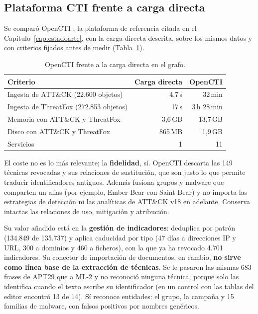 \subsection{Plataforma CTI frente a carga directa}

Se comparó OpenCTI \cite{opencti}, la plataforma de referencia citada en el
Capítulo~\ref{cap:estadoarte}, con la carga directa descrita, sobre los mismos datos y con
criterios fijados antes de medir (Tabla~\ref{tab:opencti}).

\begin{table}[H]
\centering
\begin{tabular}{|l|r|r|}
\hline
\textbf{Criterio} & \textbf{Carga directa} & \textbf{OpenCTI} \\
\hline
Ingesta de ATT\&CK (22.600 objetos) & 4,7\,s & 32\,min \\
Ingesta de ThreatFox (272.853 objetos) & 17\,s & 3\,h 28\,min \\
Memoria con ATT\&CK y ThreatFox & 3,6\,GB & 13,7\,GB \\
Disco con ATT\&CK y ThreatFox & 865\,MB & 1,9\,GB \\
Servicios & 1 & 11 \\
\hline
\end{tabular}
\caption{OpenCTI frente a la carga directa en el grafo.}
\label{tab:opencti}
\end{table}

El coste no es lo más relevante; la \textbf{fidelidad}, sí. OpenCTI descarta las 149 técnicas
revocadas y sus relaciones de sustitución, que son justo lo que permite traducir identificadores
antiguos. Además fusiona grupos y malware que comparten un alias (por ejemplo, Ember Bear con Saint
Bear) y no importa las estrategias de detección ni las analíticas de ATT\&CK v18 en adelante.
Conserva intactas las relaciones de uso, mitigación y atribución.

Su valor añadido está en la \textbf{gestión de indicadores}: deduplica por patrón (134.849 de 135.737)
y aplica caducidad por tipo (47 días a direcciones IP y URL, 300 a dominios y 460 a ficheros), con la
que ya ha revocado 4.701 indicadores. Su conector de importación de documentos, en cambio, \textbf{no sirve como línea base de la
extracción de técnicas}. Se le pasaron las mismas 683 frases de APT29 que a ML-2 y no reconoció
ninguna técnica, porque solo las identifica cuando el texto escribe su identificador (en un control
con las tablas del editor encontró 13 de 14). Sí reconoce entidades: el grupo, la campaña y 15
familias de malware, con falsos positivos por nombres genéricos.

